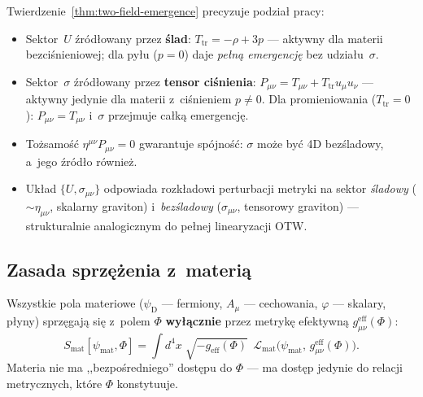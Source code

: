 \begin{remark}\label{rem:two-field-structure}
Twierdzenie~\ref{thm:two-field-emergence} precyzuje podzia\l{} pracy:
\begin{itemize}[nosep]
  \item Sektor~$U$ \'zr\'od\l{}owany przez \textbf{\'slad}:
    $T_{\mathrm{tr}} = -\rho + 3p$ --- aktywny dla materii
    bezci\'snieniowej; dla py\l{}u ($p=0$) daje \emph{pe\l{}n\k{a}
    emergencj\k{e}} bez udzia\l{}u~$\sigma$.
  \item Sektor~$\sigma$ \'zr\'od\l{}owany przez \textbf{tensor ci\'snienia}:
    $P_{\mu\nu} = T_{\mu\nu} + T_{\mathrm{tr}}u_\mu u_\nu$ ---
    aktywny jedynie dla materii z~ci\'snieniem $p\neq 0$.
    Dla promieniowania ($T_{\mathrm{tr}}=0$): $P_{\mu\nu}=T_{\mu\nu}$
    i~$\sigma$ przejmuje ca\l{}k\k{a} emergencj\k{e}.
  \item Tożsamość $\eta^{\mu\nu}P_{\mu\nu}=0$ gwarantuje
    sp\'ojno\'s\'c: $\sigma$ mo\.ze by\'c 4D bezśladowy,
    a~jego \'zr\'od\l{}o r\'ownie\.z.
  \item Uk\l{}ad $\{U, \sigma_{\mu\nu}\}$ odpowiada rozk\l{}adowi
    perturbacji metryki na sektor \emph{\'sladowy}
    ($\sim\eta_{\mu\nu}$, skalarny graviton) i~\emph{bezśladowy}
    ($\sigma_{\mu\nu}$, tensorowy graviton) --- strukturalnie
    analogicznym do pe\l{}nej linearyzacji OTW.
\end{itemize}
\end{remark}

\subsection{Zasada sprz\k{e}\.zenia z~materi\k{a}}\label{ssec:matter-coupling}

\begin{axiom}\label{ax:metric-coupling}
Wszystkie pola materiowe ($\psi_{\mathrm{D}}$ --- fermiony,
$A_\mu$ --- cechowania, $\varphi$ --- skalary, p\l{}yny)
sprz\k{e}gaj\k{a} si\k{e} z~polem $\Phi$ \textbf{wy\l{}\k{a}cznie}
przez metryk\k{e} efektywn\k{a} $g_{\mu\nu}^{\mathrm{eff}}(\Phi)$:
\begin{equation}\label{eq:metric-coupling}
  \boxed{
    S_{\mathrm{mat}}[\psi_{\mathrm{mat}}, \Phi]
    = \int d^4x\;\sqrt{-g_{\mathrm{eff}}(\Phi)}\;\,
      \mathcal{L}_{\mathrm{mat}}\!\bigl(
        \psi_{\mathrm{mat}},\, g^{\mathrm{eff}}_{\mu\nu}(\Phi)
      \bigr).
  }
\end{equation}
Materia nie ma ,,bezpo\'sredniego'' dost\k{e}pu do $\Phi$ ---
ma dost\k{e}p jedynie do relacji metrycznych, kt\'ore $\Phi$
konstytuuje.
\end{axiom}

